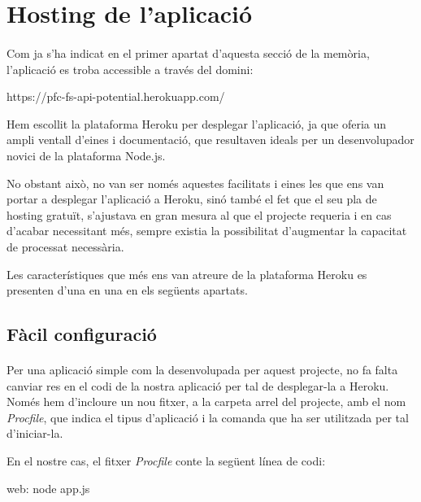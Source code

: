 \section{Hosting de l'aplicació}

    \paragraph{}
    Com ja s'ha indicat en el primer apartat d'aquesta secció de la memòria, l'aplicació es troba accessible a través del domini:

    \begin{displayquote}
        https://pfc-fs-api-potential.herokuapp.com/
    \end{displayquote}

    Hem escollit la plataforma Heroku per desplegar l'aplicació, ja que oferia un ampli ventall d'eines i documentació, que resultaven ideals per un desenvolupador novici de la plataforma Node.js.

    No obstant això, no van ser només aquestes facilitats i eines les que ens van portar a desplegar l'aplicació a Heroku, sinó també el fet que el seu pla de hosting gratuït, s'ajustava en gran mesura al que el projecte requeria i en cas d'acabar necessitant més, sempre existia la possibilitat d'augmentar la capacitat de processat necessària.

    Les característiques que més ens van atreure de la plataforma Heroku es presenten d'una en una en els següents apartats.

    \subsection{Fàcil configuració}

    \paragraph{}
    Per una aplicació simple com la desenvolupada per aquest projecte, no fa falta canviar res en el codi de la nostra aplicació per tal de desplegar-la a Heroku. Només hem d'incloure un nou fitxer, a la carpeta arrel del projecte, amb el nom \emph{Procfile}, que indica el tipus d'aplicació i la comanda que ha ser utilitzada per tal d'iniciar-la.

    En el nostre cas, el fitxer \emph{Procfile} conte la següent línea de codi:

    \begin{displayquote}
        web: node app.js
    \end{displayquote}


